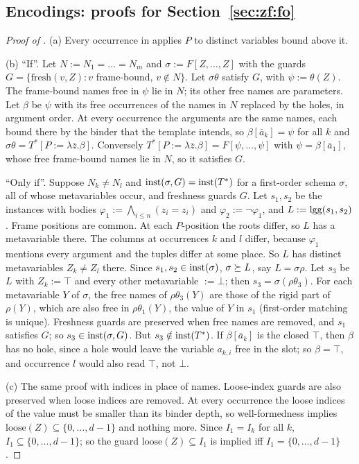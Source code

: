 \subsection{Encodings: proofs for Section~\ref{sec:zf:fo}}\label{app:zf:enc}

\begin{proof}[Proof of ]
(a) Every occurrence in  applies $P$ to distinct variables bound above it.

(b) ``If''. Let $N:=N_1=\dots=N_m$ and $\sigma:=F[Z,\dots,Z]$ with the guards $G=\{\mathrm{fresh}(v,Z):v$ frame-bound,
$v\notin N\}$. Let $\sigma\theta$ satisfy $G$, with $\psi:=\theta(Z)$. The frame-bound names free in $\psi$ lie in $N$;
its other free names are parameters. Let $\beta$ be $\psi$ with its free occurrences of the names in $N$ replaced by
the holes, in argument order. At every occurrence the arguments are the same names, each bound there by the binder
that the template intends, so $\beta[\bar a_k]=\psi$ for all $k$ and $\sigma\theta=T^*[P:=\lambda\bar z.\beta]$.
Conversely $T^*[P:=\lambda\bar z.\beta]=F[\psi,\dots,\psi]$ with $\psi=\beta[\bar a_1]$, whose free frame-bound names
lie in $N$, so it satisfies $G$.

``Only if''. Suppose $N_k\ne N_l$ and $\mathrm{inst}(\sigma,G)=\mathrm{inst}(T^*)$ for a first-order schema $\sigma$, all of whose
metavariables occur, and freshness guards $G$. Let $s_1,s_2$ be the instances with bodies
$\varphi_1:=\bigwedge_{i\le n}(z_i=z_i)$ and $\varphi_2:=\neg\varphi_1$, and $L:=\mathrm{lgg}(s_1,s_2)$. Frame positions are
common. At each $P$-position the roots differ, so $L$ has a metavariable there. The columns at occurrences $k$ and $l$
differ, because $\varphi_1$ mentions every argument and the tuples differ at some place. So $L$ has distinct
metavariables $Z_k\ne Z_l$ there. Since $s_1,s_2\in\mathrm{inst}(\sigma)$, $\sigma\succeq L$, say $L=\sigma\rho$. Let $s_3$ be $L$
with $Z_k:=\top$ and every other metavariable $:=\bot$; then $s_3=\sigma(\rho\theta_3)$. For each metavariable $Y$ of
$\sigma$, the free names of $\rho\theta_3(Y)$ are those of the rigid part of $\rho(Y)$, which are also free in
$\rho\theta_1(Y)$, the value of $Y$ in $s_1$ (first-order matching is unique). Freshness guards are preserved when free
names are removed, and $s_1$ satisfies $G$; so $s_3\in\mathrm{inst}(\sigma,G)$. But $s_3\notin\mathrm{inst}(T^*)$. If $\beta[\bar a_k]$
is the closed $\top$, then $\beta$ has no hole, since a hole would leave the variable $a_{k,i}$ free in the slot; so
$\beta=\top$, and occurrence $l$ would also read $\top$, not $\bot$.

(c) The same proof with indices in place of names. Loose-index guards are also preserved when loose indices are removed.
At every occurrence the loose indices of the value must be smaller than its binder depth, so well-formedness implies
$\mathrm{loose}(Z)\subseteq\{0,\dots,d-1\}$ and nothing more. Since $I_1=I_k$ for all $k$, $I_1\subseteq\{0,\dots,d-1\}$;
so the guard $\mathrm{loose}(Z)\subseteq I_1$ is implied iff $I_1=\{0,\dots,d-1\}$.
\end{proof}

